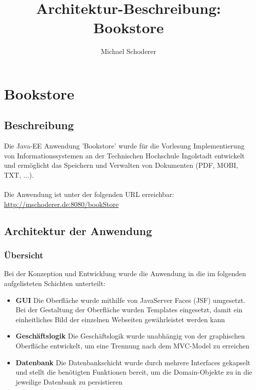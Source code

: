 \documentclass[12pt,a4paper]{book}
\author{Michael Schoderer}
\title{Architektur-Beschreibung: Bookstore}
\begin{document}
	\chapter{Bookstore}
	\section{Beschreibung}
	Die Java-EE Anwendung 'Bookstore' wurde für die Vorlesung Implementierung von Informationssystemen an der Technischen Hochschule Ingolstadt entwickelt und ermöglicht das Speichern und Verwalten von Dokumenten (PDF, MOBI, TXT, ...).\\
	\\
	Die Anwendung ist unter der folgenden URL erreichbar: \url{http://mschoderer.de:8080/bookStore}
	\section{Architektur der Anwendung}
	\subsection{Übersicht}
	Bei der Konzeption und Entwicklung wurde die Anwendung in die im folgenden aufgelisteten Schichten unterteilt:
	\begin{itemize}
		\item \textbf{GUI} Die Oberfläche wurde mithilfe von JavaServer Faces (JSF) umgesetzt. Bei der Gestaltung der Oberfläche wurden Templates eingesetzt, damit ein einheitliches Bild der einzelnen Webseiten gewährleistet werden kann
		\item \textbf{Geschäftslogik} Die Geschäftslogik wurde unabhängig von der graphischen Oberfläche entwickelt, um eine Trennung nach dem MVC-Model zu erreichen
		\item \textbf{Datenbank} Die Datenbankschicht wurde durch mehrere Interfaces gekapselt und stellt die benötigten Funktionen bereit, um die Domain-Objekte zu in die jeweilige Datenbank zu persistieren		
		\end{itemize}
		
		
		
		
\end{document}

